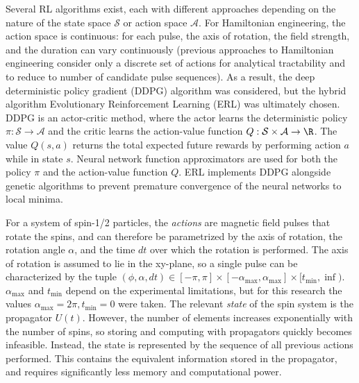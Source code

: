 \documentclass{article}
\begin{document}
Several RL algorithms exist, each with different approaches depending on the nature of the state space $\mathcal{S}$ or action space $\mathcal{A}$. For Hamiltonian engineering, the action space is continuous: for each pulse, the axis of rotation, the field strength, and the duration can vary continuously (previous approaches to Hamiltonian engineering consider only a discrete set of actions for analytical tractability and to reduce to number of candidate pulse sequences). As a result, the deep deterministic policy gradient (DDPG) algorithm\cite{lillicrap2015continuous} was considered, but the hybrid algorithm Evolutionary Reinforcement Learning (ERL) \cite{khadka2018evolutionguided} was ultimately chosen.
DDPG is an actor-critic method, where the actor learns the deterministic policy $\pi: \mathcal{S} \to \mathcal{A}$ and the critic learns the action-value function $Q: \mathcal{S} \times \mathcal{A} \to \R$. The value $Q(s,a)$ returns the total expected future rewards by performing action $a$ while in state $s$. Neural network function approximators are used for both the policy $\pi$ and the action-value function $Q$. ERL implements DDPG alongside genetic algorithms to prevent premature convergence of the neural networks to local minima.

For a system of spin-1/2 particles, the \emph{actions} are magnetic field pulses that rotate the spins, and can therefore be parametrized by the axis of rotation, the rotation angle $\alpha$, and the time $dt$ over which the rotation is performed.
The axis of rotation is assumed to lie in the xy-plane, so a single pulse can be characterized by the tuple $(\phi, \alpha, dt) \in [-\pi,\pi] \times [-\alpha_\text{max}, \alpha_\text{max}] \times [t_\text{min}, \inf)$.
$\alpha_\text{max}$ and $t_\text{min}$ depend on the experimental limitations, but for this research the values $\alpha_\text{max} = 2\pi, t_\text{min} = 0$ were taken.
The relevant \emph{state} of the spin system is the propagator $U(t)$. However, the number of elements increases exponentially with the number of spins, so storing and computing with propagators quickly becomes infeasible.
Instead, the state is represented by the sequence of all previous actions performed. This contains the equivalent information stored in the propagator, and requires significantly less memory and computational power.
\end{document}
